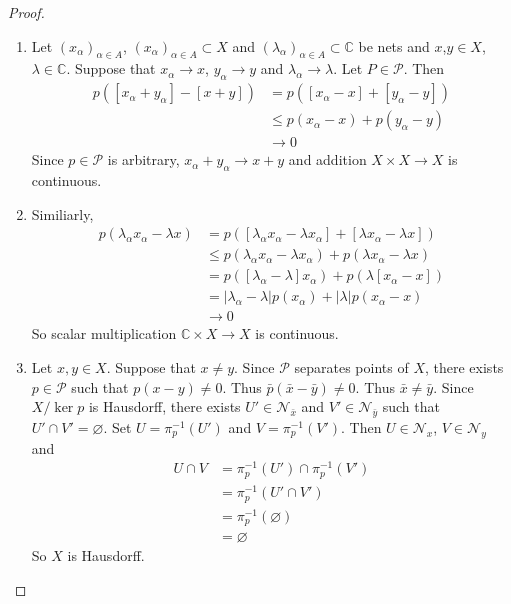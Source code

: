 \documentclass[12pt]{amsart}
\theoremstyle{definition}
\newcommand{\al}{\alpha}
\newcommand{\lam}{\lambda}
\newcommand{\C}{\mathbb{C}}
\newcommand{\MN}{\mathcal{N}}
\newcommand{\MP}{\mathcal{P}}
\DeclareMathOperator*{\0}{\mbf{0}}
\DeclareMathOperator*{\1}{\mbf{1}}
\begin{document}
	\begin{proof}\
		\begin{enumerate}
			\item Let $(x_{\al})_{\al \in A}$, $(x_{\al})_{\al \in A} \subset X$ and $(\lam_{\al})_{\al \in A} \subset \C$ be nets and $x$,$y \in X$, $\lam \in \C$. Suppose that $x_{\al} \rightarrow x$, $y_{\al} \rightarrow y$ and $\lam_{\al} \rightarrow \lam$. Let $P \in \MP$. Then 
			\begin{align*}
				p([x_{\al} + y_{\al}] - [x + y]) 
				&= p([x_{\al} - x] + [y_{\al} - y]) \\
				&\leq p(x_{\al} - x) + p(y_{\al} - y) \\
				& \rightarrow 0
			\end{align*}
			Since $p \in \MP$ is arbitrary, $x_{\al} + y_{\al} \rightarrow x + y$ and addition $X \times X \rightarrow X$ is continuous. \\
			
			\item Similiarly, 
			\begin{align*}
				p(\lam_{\al} x_{\al} - \lam x) 
				&= p([\lam_{\al} x_{\al} - \lam x_{\al}] + [\lam x_{\al} - \lam x]) \\
				& \leq p(\lam_{\al} x_{\al} - \lam x_{\al}) + p(\lam x_{\al} - \lam x) \\
				&= p([\lam_{\al} - \lam] x_{\al}) + p(\lam [x_{\al} - x]) \\
				&= |\lam_{\al} - \lam|p(x_{\al}) + |\lam|p(x_{\al} - x) \\
				&\rightarrow 0 
			\end{align*}
			So scalar multiplication $ \C \times X \rightarrow X$ is  continuous. \\

			\item Let $x, y \in X$. Suppose that $x \neq y$. Since $\MP$ separates points of $X$, there exists $p \in \MP$ such that $p(x - y) \neq 0$. Thus $\bar{p}(\bar{x} - \bar{y}) \neq 0$. Thus $\bar{x} \neq \bar{y}$. Since $X / \ker p$ is Hausdorff, there exists $U' \in \MN_{\bar{x}}$ and $V' \in \MN_{\bar{y}}$ such that $U' \cap V' = \varnothing$. Set $U = \pi_p^{-1}(U')$ and $V =  \pi_p^{-1}(V')$. Then $U \in \MN_x$, $V \in \MN_y$ and  
			\begin{align*}
				U \cap V 
				&= \pi_p^{-1}(U') \cap  \pi_p^{-1}(V') \\
				&=  \pi_p^{-1}(U' \cap V') \\
				&=  \pi_p^{-1}(\varnothing) \\
				&= \varnothing
			\end{align*}
			So $X$ is Hausdorff.
		\end{enumerate}
	\end{proof}
\end{document}
